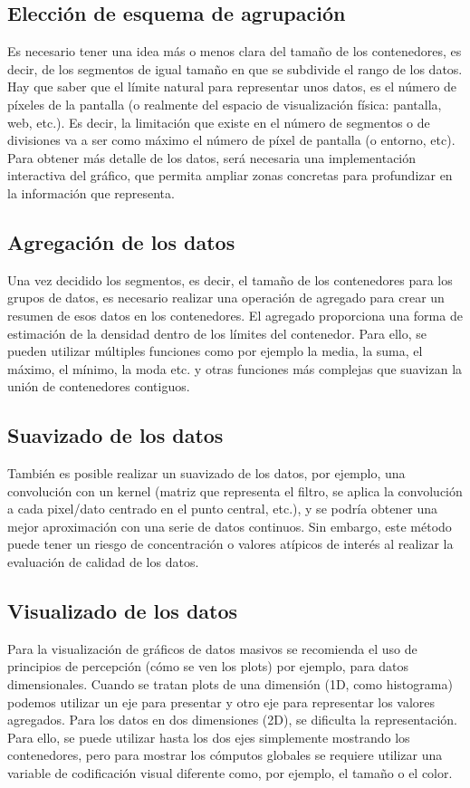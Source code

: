\subsection{Elección de esquema de agrupación}
Es necesario tener una idea más o menos clara del tamaño de los contenedores, es decir, de los segmentos de igual tamaño en que se subdivide el rango de los datos. Hay que saber que el límite natural para representar unos datos, es el número de píxeles de la pantalla (o realmente del espacio de visualización física: pantalla, web, etc.). Es decir, la limitación que existe en el número de segmentos o de divisiones va a ser como máximo el número de píxel de pantalla (o entorno, etc). Para obtener más detalle de los datos, será necesaria una implementación interactiva del gráfico, que permita ampliar zonas concretas para profundizar en la información que representa.

\subsection{Agregación de los datos}
Una vez decidido los segmentos, es decir, el tamaño de los contenedores para los grupos de datos, es necesario realizar una operación de agregado para crear un resumen de esos datos en los contenedores. El agregado proporciona una forma de estimación de la densidad dentro de los límites del contenedor. Para ello, se pueden utilizar múltiples funciones como por ejemplo la media, la suma, el máximo, el mínimo, la moda etc. y otras funciones más complejas que suavizan la unión de contenedores contiguos.

\subsection{Suavizado de los datos}
También es posible realizar un suavizado de los datos, por ejemplo, una convolución con un kernel (matriz que representa el filtro, se aplica la convolución a cada pixel/dato centrado en el punto central, etc.), y se podría obtener una mejor aproximación con una serie de datos continuos. Sin embargo, este método puede tener un riesgo de concentración o valores atípicos de interés al realizar la evaluación de calidad de los datos.

\subsection{Visualizado de los datos}
Para la visualización de gráficos de datos masivos se recomienda el uso de principios de percepción (cómo se ven los plots) por ejemplo, para datos dimensionales. Cuando se tratan plots de una dimensión (1D, como histograma) podemos utilizar un eje para presentar y otro eje para representar los valores agregados. Para los datos en dos dimensiones (2D), se dificulta la representación. Para ello, se puede utilizar hasta los dos ejes simplemente mostrando los contenedores, pero para mostrar los cómputos globales se requiere utilizar una variable de codificación visual diferente como, por ejemplo, el tamaño o el color.

